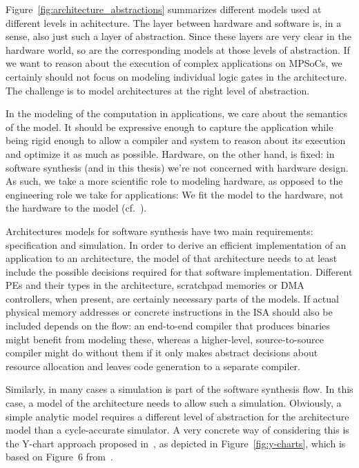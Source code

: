 Figure~\ref{fig:architecture_abstractions} summarizes different models used at different levels in achitecture.
The layer between hardware and software is, in a sense, also just such a layer of abstraction.
Since these layers are very clear in the hardware world, so are the corresponding models at those levels of abstraction.
If we want to reason about the execution of complex applications on \acp{MPSoC}, we certainly should not focus on modeling individual logic gates in the architecture.
The challenge is to model architectures at the right level of abstraction.

In the modeling of the computation in applications, we care about the semantics of the model.
It should be expressive enough to capture the application while being rigid enough to allow a compiler and system to reason about its execution and optimize it as much as possible.
Hardware, on the other hand, is fixed: in software synthesis (and in this thesis) we're not concerned with hardware design.
As such, we take a more scientific role to modeling hardware, as opposed to the engineering role we take for applications: We fit the model to the hardware, not the hardware to the model (cf.~\cite{lee2017plato}).

Architectures models for software synthesis have two main requirements: specification and simulation.
In order to derive an efficient implementation of an application to an architecture, the model of that architecture needs to at least include the possible decisions required for that software implementation.
Different \acp{PE} and their types in the architecture, scratchpad memories or \ac{DMA} controllers, when present, are certainly necessary parts of the models.
If actual physical memory addresses or concrete instructions in the \ac{ISA} should also be included depends on the flow: an end-to-end compiler that produces binaries might benefit from modeling these,
whereas a higher-level, source-to-source compiler might do without them if it only makes abstract decisions about resource allocation and leaves code generation to a separate compiler.


Similarly, in many cases a simulation is part of the software synthesis flow.
In this case, a model of the architecture needs to allow such a simulation.
Obviously, a simple analytic model requires a different level of abstraction for the architecture model than a cycle-accurate simulator.
A very concrete way of considering this is the Y-chart approach proposed in~\cite{kienhuis2001methodology}, as depicted in Figure~\ref{fig:y-charts}, which is based on Figure~6 from~\cite{kienhuis2001methodology}. 

